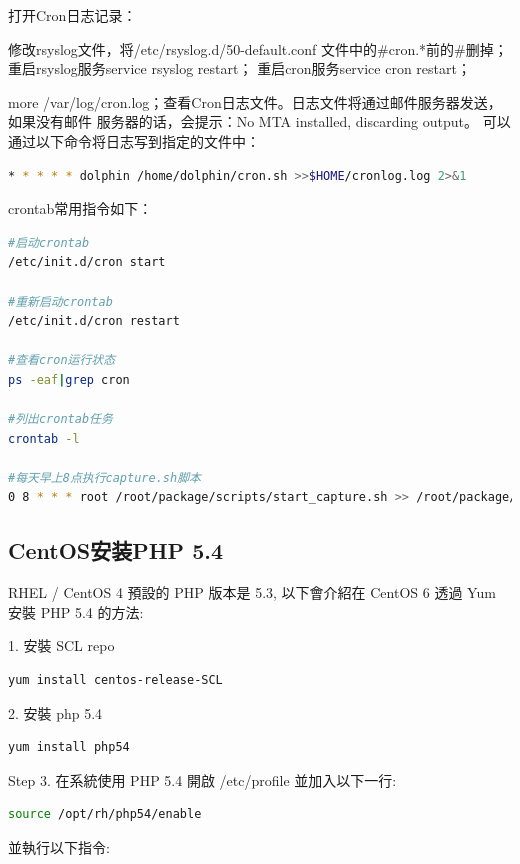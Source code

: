 \documentclass{book}
\begin{document}
打开Cron日志记录：

修改rsyslog文件，将/etc/rsyslog.d/50-default.conf 文件中的\#cron.*前的\#删掉；
重启rsyslog服务service rsyslog restart；
重启cron服务service cron restart；

more /var/log/cron.log；查看Cron日志文件。日志文件将通过邮件服务器发送，如果没有邮件
服务器的话，会提示：No MTA installed, discarding output。
可以通过以下命令将日志写到指定的文件中：

\begin{lstlisting}[language=Bash]
* * * * * dolphin /home/dolphin/cron.sh >>$HOME/cronlog.log 2>&1
\end{lstlisting}

crontab常用指令如下：

\begin{lstlisting}[language=Bash]
#启动crontab
/etc/init.d/cron start

#重新启动crontab
/etc/init.d/cron restart

#查看cron运行状态
ps -eaf|grep cron

#列出crontab任务
crontab -l

#每天早上8点执行capture.sh脚本
0 8 * * * root /root/package/scripts/start_capture.sh >> /root/package/capture.log
\end{lstlisting}

\subsection{CentOS安装PHP 5.4}

RHEL / CentOS 4 預設的 PHP 版本是 5.3, 以下會介紹在 CentOS 6 透過 Yum 安裝 PHP 5.4 的方法:

1. 安裝 SCL repo

\begin{lstlisting}[language=Bash]
yum install centos-release-SCL
\end{lstlisting}


2. 安裝 php 5.4

\begin{lstlisting}[language=Bash]
yum install php54
\end{lstlisting}

Step 3. 在系統使用 PHP 5.4
開啟 /etc/profile 並加入以下一行:

\begin{lstlisting}[language=Bash]
source /opt/rh/php54/enable
\end{lstlisting}

並執行以下指令:
\end{document}

